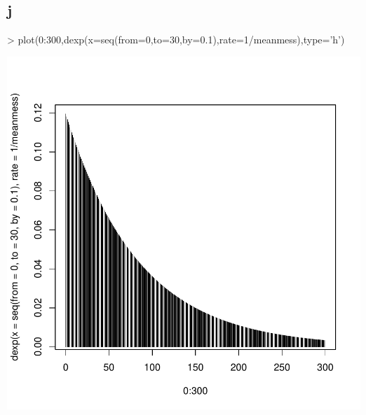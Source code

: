 \subsection{j}
\begin{Schunk}
\begin{Sinput}
> plot(0:300,dexp(x=seq(from=0,to=30,by=0.1),rate=1/meanmess),type='h')
\end{Sinput}
\end{Schunk}
\includegraphics{sw10_1-011}

